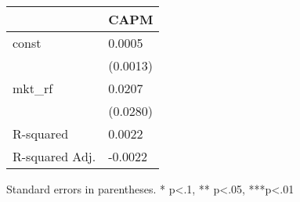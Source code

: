 \begin{table}
\caption{}
\label{}
\begin{center}
\begin{tabular}{ll}
\hline
               & CAPM      \\
\hline
const          & 0.0005    \\
               & (0.0013)  \\
mkt\_rf        & 0.0207    \\
               & (0.0280)  \\
R-squared      & 0.0022    \\
R-squared Adj. & -0.0022   \\
\hline
\end{tabular}
\end{center}
\end{table}
\bigskip
Standard errors in parentheses. \newline 
* p<.1, ** p<.05, ***p<.01